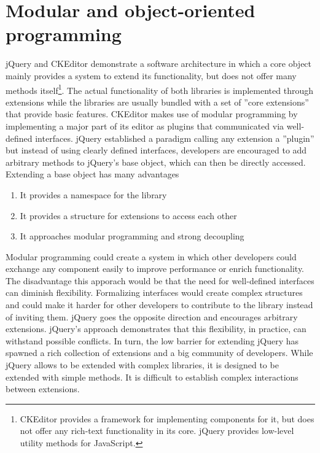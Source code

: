 

\section{Modular and object-oriented programming}
\label{subsec:modular_and_oop}

jQuery and CKEditor demonstrate a software architecture in which a core object mainly provides a system to extend its functionality, but does not offer many methods itself\footnote{CKEditor provides a framework for implementing components for it, but does not offer any rich-text functionality in its core. jQuery provides low-level utility methods for JavaScript.}. The actual functionality of both libraries is implemented through extensions while the libraries are usually bundled with a set of ''core extensions'' that provide basic features. CKEditor makes use of modular programming by implementing a major part of its editor as plugins that communicated via well-defined interfaces. jQuery established a paradigm calling any extension a ''plugin'' but instead of using clearly defined interfaces, developers are encouraged to add arbitrary methods to jQuery's base object, which can then be directly accessed. Extending a base object has many advantages

\begin{enumerate}
\item It provides a namespace for the library
\item It provides a structure for extensions to access each other
\item It approaches modular programming and strong decoupling
\end{enumerate}

Modular programming could create a system in which other developers could exchange any component easily to improve performance or enrich functionality. The disadvantage this apporach would be that the need for well-defined interfaces can diminish flexibility. Formalizing interfaces would create complex structures and could make it harder for other developers to contribute to the library instead of inviting them. jQuery goes the opposite direction and encourages arbitrary extensions. jQuery's approach demonstrates that this flexibility, in practice, can withstand possible conflicts. In turn, the low barrier for extending jQuery has spawned a rich collection of extensions and a big community of developers. While jQuery allows to be extended with complex libraries, it is designed to be extended with simple methods. It is difficult to establish complex interactions between extensions.


